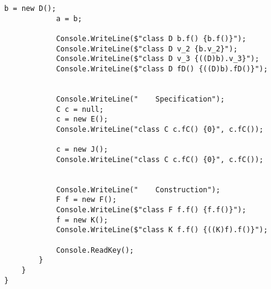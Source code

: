 \begin{lstlisting}[language={[Sharp]C}]
            b = new D();
            a = b;

            Console.WriteLine($"class D b.f() {b.f()}");
            Console.WriteLine($"class D v_2 {b.v_2}");
            Console.WriteLine($"class D v_3 {((D)b).v_3}");
            Console.WriteLine($"class D fD() {((D)b).fD()}");


            Console.WriteLine("    Specification");
            C c = null;
            c = new E();
            Console.WriteLine("class C c.fC() {0}", c.fC());

            c = new J();
            Console.WriteLine("class C c.fC() {0}", c.fC());


            Console.WriteLine("    Construction");
            F f = new F();
            Console.WriteLine($"class F f.f() {f.f()}");
            f = new K();
            Console.WriteLine($"class K f.f() {((K)f).f()}");

            Console.ReadKey();
        }
    }
}

\end{lstlisting}